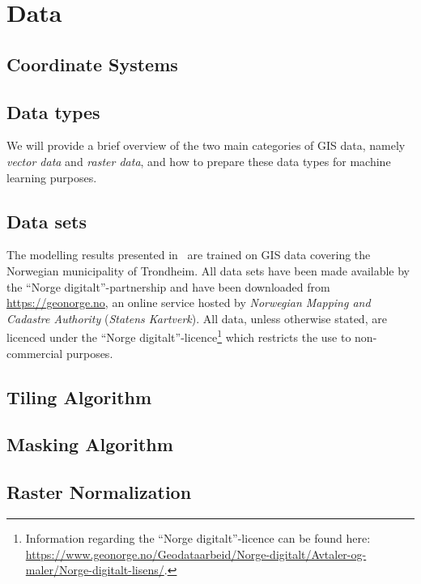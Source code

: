 \section{Data}%
\label{sec:data}



\subsection{Coordinate Systems}%
\label{sec:coordinate-systems}


\subsection{Data types}%
\label{sec:data-types}

We will provide a brief overview of the two main categories of GIS data, namely \textit{vector data} and \textit{raster data}, and how to prepare these data types for machine learning purposes.



%
\label{sec:raster-data}


\subsection{Data sets}%
\label{sec:data-sets}

The modelling results presented in~ are trained on GIS data covering the Norwegian municipality of Trondheim.
All data sets have been made available by the \enquote{Norge digitalt}-partnership and have been downloaded from \url{https://geonorge.no}, an online service hosted by \textit{Norwegian Mapping and Cadastre Authority} (\textit{Statens Kartverk}).
All data, unless otherwise stated, are licenced under the \enquote{Norge digitalt}-licence\footnote{Information regarding the \enquote{Norge digitalt}-licence can be found here:\\ \url{https://www.geonorge.no/Geodataarbeid/Norge-digitalt/Avtaler-og-maler/Norge-digitalt-lisens/}.} which restricts the use to non-commercial purposes.





\subsection{Tiling Algorithm}%
\label{sec:tiling-algorithm}


\subsection{Masking Algorithm}%
\label{sec:masking-algorithm}


\subsection{Raster Normalization}%
\label{sec:raster-normalization}

